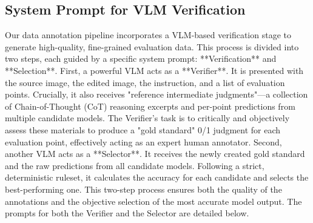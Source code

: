 \subsection{System Prompt for VLM Verification}
\label{sec:verification}
Our data annotation pipeline incorporates a VLM-based verification stage to generate high-quality, fine-grained evaluation data. This process is divided into two steps, each guided by a specific system prompt: **Verification** and **Selection**.
First, a powerful VLM acts as a **Verifier**. It is presented with the source image, the edited image, the instruction, and a list of evaluation points. Crucially, it also receives "reference intermediate judgments"---a collection of Chain-of-Thought (CoT) reasoning excerpts and per-point predictions from multiple candidate models. The Verifier's task is to critically and objectively assess these materials to produce a "gold standard" 0/1 judgment for each evaluation point, effectively acting as an expert human annotator.
Second, another VLM acts as a **Selector**. It receives the newly created gold standard and the raw predictions from all candidate models. Following a strict, deterministic ruleset, it calculates the accuracy for each candidate and selects the best-performing one. This two-step process ensures both the quality of the annotations and the objective selection of the most accurate model output.
The prompts for both the Verifier and the Selector are detailed below.
